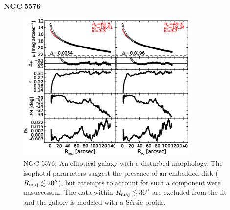 \documentclass[preprint2]{emulateapj}
\newcommand{\fitfigurewidth}{0.8\textwidth}
\begin{document}
  \clearpage\newpage\noindent

  {\bf NGC 5576 \\}

  \begin{figure}[h]
  \begin{center}
  \includegraphics[width=\fitfigurewidth]{images/n5576_1Dfit.eps}
  \caption{NGC 5576: 
  An elliptical galaxy with a disturbed morphology. 
  The isophotal parameters suggest the presence of an embedded disk ($R_{\rm maj} \lesssim 20''$), 
  but attempts to account for such a component were unsuccessful. 
  The data within $R_{\rm maj} \lesssim 36''$ are excluded from the fit 
  and the galaxy is modeled with a S\'ersic profile.
  } 
  \end{center}
  \end{figure}
  
\end{document}
